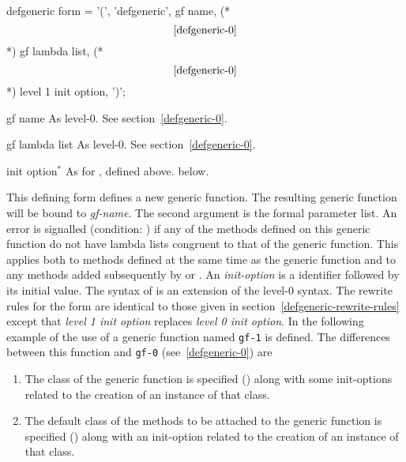 \begin{optDefinition}
\label{defgeneric-1}
%
\Syntax
\savesyntax{}\vbox{\small\syntax
defgeneric form
   = '(', 'defgeneric',
     gf name, (* \[\ref{defgeneric-0}\] *)
     gf lambda list, (* \[\ref{defgeneric-0}\] *)
     {level 1 init option}, ')';
\endsyntax}
%
\begin{arguments}
    \item[gf name] As level-0.  See section~\ref{defgeneric-0}.

    \item[gf lambda list] As level-0.  See section~\ref{defgeneric-0}.

    \item[init option\/$^*$] As for , defined above.
    below.
\end{arguments}
%
\remarks%
This defining form defines a new generic function.  The resulting generic
function will be bound to {\em gf-name}.  The second argument is the formal
parameter list.  An error is signalled (condition:
)
if any of the methods defined on this generic function do not have lambda lists
congruent to that of the generic function.  This applies both to methods defined
at the same time as the generic function and to any methods added subsequently
by  or .  An {\em init-option} is a
identifier followed by its initial value.  The syntax of 
is an extension of the level-0 syntax.  The rewrite rules for the
 form are identical to those given in
section~\ref{defgeneric-rewrite-rules} except that {\em level 1 init option}
replaces {\em level 0 init option}.
%
\examples
In the following example of the use of  a generic
function named {\tt gf-1} is defined.  The differences between this
function and {\tt gf-0} (see~\ref{defgeneric-0}) are
\begin{enumerate}
    \item The class of the generic function is specified
    () along with some init-options related to the
    creation of an instance of that class.

    \item The default class of the methods to be attached to the generic
    function is specified () along with an
    init-option related to the creation of an instance of that class.


\end{enumerate}
\end{optDefinition}
